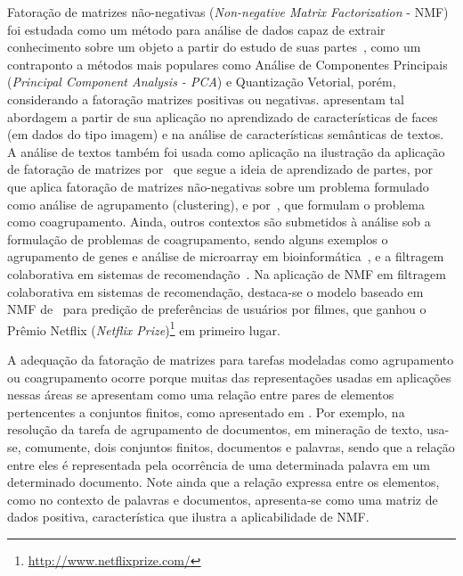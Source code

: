 \documentclass[
    12pt,                %
    oneside,            %
    a4paper,            %
    english,            %
    brazil                %
    ]{abntex2ppgsi}
\begin{document}
Fatoração de matrizes não-negativas (\textit{Non-negative Matrix Factorization} - NMF) foi estudada como um método para análise de dados capaz de extrair conhecimento sobre um objeto a partir do estudo de suas partes~\cite{lee99}, como um contraponto a métodos mais populares como Análise de Componentes Principais (\textit{Principal Component Analysis - PCA}) e Quantização Vetorial, porém, considerando a fatoração matrizes positivas ou negativas.
 apresentam tal abordagem a partir de sua aplicação no aprendizado de características de faces (em dados do tipo imagem) e na análise de características semânticas de textos.
A análise de textos também foi usada como aplicação na ilustração da aplicação de fatoração de matrizes por~ que segue a ideia de aprendizado de partes, por~ que aplica fatoração de matrizes não-negativas sobre um problema formulado como análise de agrupamento (clustering), e por~, que formulam o problema como coagrupamento.
Ainda, outros contextos são submetidos à análise sob a formulação de problemas de coagrupamento, sendo alguns exemplos o agrupamento de genes e análise de microarray em bioinformática~\cite{Kluger2003}, e a filtragem colaborativa em sistemas de recomendação~\cite{SalMnih08}.
Na aplicação de NMF em filtragem colaborativa em sistemas de recomendação, destaca-se o modelo baseado em NMF de~ para predição de preferências de usuários por filmes, que ganhou o Prêmio Netflix (\textit{Netflix Prize})\footnote{\url{http://www.netflixprize.com/}} em primeiro lugar.

A adequação da fatoração de matrizes para tarefas modeladas como agrupamento ou coagrupamento ocorre porque muitas das representações usadas em aplicações nessas áreas se apresentam como uma relação entre pares de elementos pertencentes a conjuntos finitos, como apresentado em \cite{Long2005}. Por exemplo, na resolução da tarefa de agrupamento de documentos, em mineração de texto, usa-se, comumente, dois conjuntos finitos, documentos e palavras, sendo que a relação entre eles é representada pela ocorrência de uma determinada palavra em um determinado documento. Note ainda que a relação expressa entre os elementos, como no contexto de palavras e documentos, apresenta-se como uma matriz de dados positiva, característica que ilustra a aplicabilidade de NMF.
\end{document}
